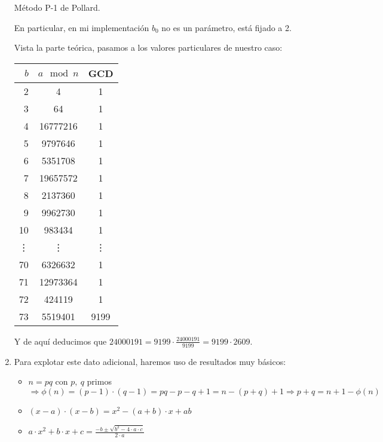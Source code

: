\begin{enumerate}
\begin{algorithm}[H]
\begin{algorithmic}[1]
			\end{algorithmic}
			\caption{Método P-1 de Pollard.}
			\label{PollardP-1}
		\end{algorithm}
		
		En particular, en mi implementación $b_0$ no es un parámetro, está fijado a 2.
		
		Vista la parte teórica, pasamos a los valores particulares de nuestro caso:
		\begin{center}
		\begin{tabular}{ | r | c | c |}
			\hline
			$b$     & $a \mod n$    & GCD \\
			\hline
			2       &  4            &  1  \\
			3       &  64           &  1  \\
			4       &  16777216     &  1  \\
			5       &  9797646      &  1  \\
			6       &  5351708      &  1  \\
			7       &  19657572     &  1  \\
			8       &  2137360      &  1  \\
			9       &  9962730      &  1  \\
			10      &  983434       &  1  \\
			\vdots  &  \vdots       &  \vdots  \\
			70      &  6326632      &  1  \\
			71      &  12973364     &  1  \\
			72      &  424119       &  1  \\
			73      &  5519401      &  9199  \\
			\hline
		\end{tabular}
		\end{center}
		
		Y de aquí deducimos que $\displaystyle 24000191 = 9199 \cdot \frac{24000191}{9199} = 9199 \cdot 2609$.
		
		\item Para explotar este dato adicional, haremos uso de resultados muy básicos:
		\begin{itemize}
			\item $n = pq$ con $p,\ q$ primos $\Rightarrow \phi(n) = (p-1) \cdot (q-1) = pq -p -q +1 = n -(p+q) +1
			\Rightarrow p+q = n+1-\phi(n)$
			\item $(x-a) \cdot (x-b) = x^2 -(a+b) \cdot x + ab$
			\item $\displaystyle a \cdot x^2 + b \cdot x + c = \frac{-b \pm \sqrt{b^2 - 4 \cdot a \cdot c}}{2 \cdot a}$
		\end{itemize}
		

\end{enumerate}
